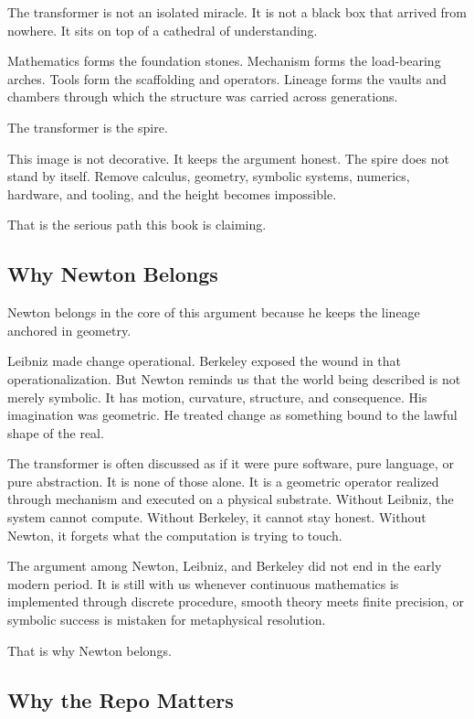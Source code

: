 The transformer is not an isolated miracle. It is not a black box that
arrived from nowhere. It sits on top of a cathedral of understanding.

Mathematics forms the foundation stones. Mechanism forms the
load-bearing arches. Tools form the scaffolding and operators. Lineage
forms the vaults and chambers through which the structure was carried
across generations.

The transformer is the spire.

This image is not decorative. It keeps the argument honest. The spire
does not stand by itself. Remove calculus, geometry, symbolic systems,
numerics, hardware, and tooling, and the height becomes impossible.

That is the serious path this book is claiming.

\hypertarget{why-newton-belongs}{%
\subsection{Why Newton Belongs}\label{why-newton-belongs}}

Newton belongs in the core of this argument because he keeps the lineage
anchored in geometry.

Leibniz made change operational. Berkeley exposed the wound in that
operationalization. But Newton reminds us that the world being described
is not merely symbolic. It has motion, curvature, structure, and
consequence. His imagination was geometric. He treated change as
something bound to the lawful shape of the real.

The transformer is often discussed as if it were pure software, pure
language, or pure abstraction. It is none of those alone. It is a
geometric operator realized through mechanism and executed on a physical
substrate. Without Leibniz, the system cannot compute. Without Berkeley,
it cannot stay honest. Without Newton, it forgets what the computation
is trying to touch.

The argument among Newton, Leibniz, and Berkeley did not end in the
early modern period. It is still with us whenever continuous mathematics
is implemented through discrete procedure, smooth theory meets finite
precision, or symbolic success is mistaken for metaphysical resolution.

That is why Newton belongs.

\hypertarget{why-the-repo-matters}{%
\subsection{Why the Repo Matters}\label{why-the-repo-matters}}

